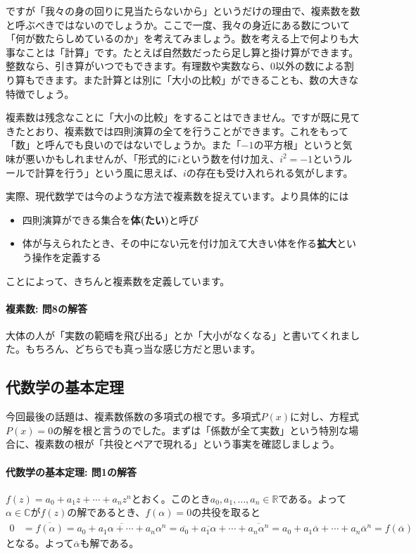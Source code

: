 ですが「我々の身の回りに見当たらないから」というだけの理由で、複素数を数と呼ぶべきではないのでしょうか。ここで一度、我々の身近にある数について「何が数たらしめているのか」を考えてみましょう。数を考える上で何よりも大事なことは「計算」です。たとえば自然数だったら足し算と掛け算ができます。整数なら、引き算がいつでもできます。有理数や実数なら、$0$以外の数による割り算もできます。また計算とは別に「大小の比較」ができることも、数の大きな特徴でしょう。

複素数は残念なことに「大小の比較」をすることはできません。ですが既に見てきたとおり、複素数では四則演算の全てを行うことができます。これをもって「数」と呼んでも良いのではないでしょうか。また「$-1$の平方根」というと気味が悪いかもしれませんが、「形式的に$i$という数を付け加え、$i^2=-1$というルールで計算を行う」という風に思えば、$i$の存在も受け入れられる気がします。

実際、現代数学では今のような方法で複素数を捉えています。より具体的には
\begin{itemize}
\item 四則演算ができる集合を\textbf{体(たい)}と呼び
\item 体が与えられたとき、その中にない元を付け加えて大きい体を作る\textbf{拡大}という操作を定義する
\end{itemize}
ことによって、きちんと複素数を定義しています。

\paragraph{複素数: 問8の解答}

大体の人が「実数の範疇を飛び出る」とか「大小がなくなる」と書いてくれました。もちろん、どちらでも真っ当な感じ方だと思います。

\subsection{代数学の基本定理}

今回最後の話題は、複素数係数の多項式の根です。多項式$P(x)$に対し、方程式$P(x)=0$の解を根と言うのでした。まずは「係数が全て実数」という特別な場合に、複素数の根が「共役とペアで現れる」という事実を確認しましょう。

\paragraph{代数学の基本定理: 問1の解答}

$f(z) = a_0 + a_1 z + \cdots + a_n z^n$とおく。このとき$a_0,a_1,\ldots,a_n\in\mathbb{R}$である。よって$\alpha\in\mathbb{C}$が$f(z)$の解であるとき、$f(\alpha)=0$の共役を取ると
\begin{align*}
0 &= \overline{f(\alpha)}
= \overline{a_0 + a_1 \alpha + \cdots + a_n \alpha^n}
= \overline{a_0} +\overline{a_1 \alpha} + \cdots + \overline{a_n \alpha^n}
= a_0 + a_1 \overline{\alpha} + \cdots + a_n \overline{\alpha}^n
= f(\overline{\alpha})
\end{align*}
となる。よって$\overline{\alpha}$も解である。

